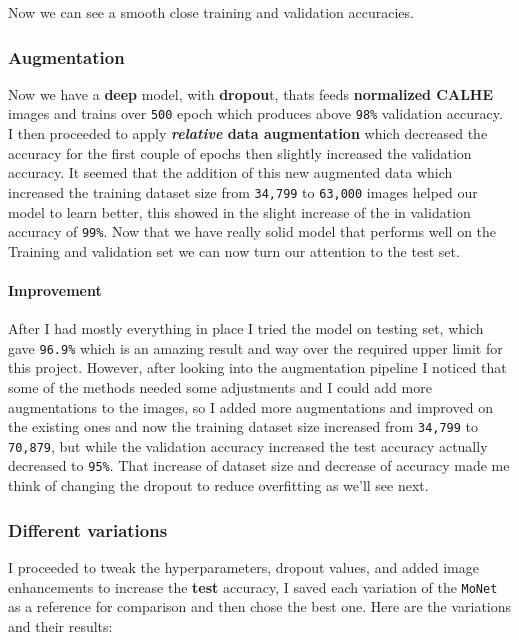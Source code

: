 \documentclass[11pt]{article}
\begin{document}
Now we can see a smooth close training and validation accuracies.

\hypertarget{augmentation}{%
\subsubsection{Augmentation}\label{augmentation}}

Now we have a \textbf{deep} model, with \textbf{dropou}t, thats feeds
\textbf{normalized CALHE} images and trains over \texttt{500} epoch
which produces above \texttt{98\%} validation accuracy. I then proceeded
to apply \textbf{\emph{relative} data augmentation} which decreased the
accuracy for the first couple of epochs then slightly increased the
validation accuracy. It seemed that the addition of this new augmented
data which increased the training dataset size from \texttt{34,799} to
\texttt{63,000} images helped our model to learn better, this showed in
the slight increase of the in validation accuracy of \texttt{99\%}. Now
that we have really solid model that performs well on the Training and
validation set we can now turn our attention to the test set.

\hypertarget{improvement}{%
\paragraph{Improvement}\label{improvement}}

After I had mostly everything in place I tried the model on testing set,
which gave \texttt{96.9\%} which is an amazing result and way over the
required upper limit for this project. However, after looking into the
augmentation pipeline I noticed that some of the methods needed some
adjustments and I could add more augmentations to the images, so I added
more augmentations and improved on the existing ones and now the
training dataset size increased from \texttt{34,799} to \texttt{70,879},
but while the validation accuracy increased the test accuracy actually
decreased to \texttt{95\%}. That increase of dataset size and decrease
of accuracy made me think of changing the dropout to reduce overfitting
as we'll see next.

\hypertarget{different-variations}{%
\subsubsection{Different variations}\label{different-variations}}

I proceeded to tweak the hyperparameters, dropout values, and added
image enhancements to increase the \textbf{test} accuracy, I saved each
variation of the \texttt{MoNet} as a reference for comparison and then
chose the best one. Here are the variations and their results:
\end{document}
